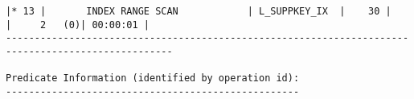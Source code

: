 \documentclass[11pt,a4paper,parskip=half]{scrartcl}
\begin{document}
\begin{lstlisting}
|* 13 |       INDEX RANGE SCAN            | L_SUPPKEY_IX  |    30 |       |     2   (0)| 00:00:01 |                                                                                                                                                                                                          
---------------------------------------------------------------------------------------------------                                                                                                                                                                                                          
                                                                                                                                                                                                                                                                                                             
Predicate Information (identified by operation id):                                                                                                                                                                                                                                                          
---------------------------------------------------                                                                                                                                                                                                                                                          
                                                                                                                                                                                                                                                                                                             

\end{lstlisting}
\end{document}
